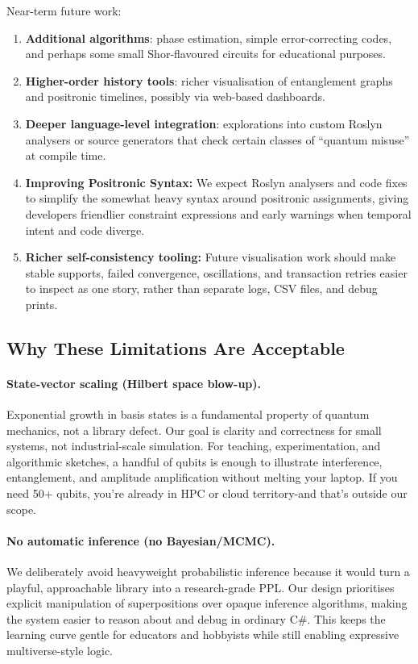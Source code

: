 \documentclass[a4paper,11pt]{article}
\begin{document}
Near-term future work:

\begin{enumerate}
\def\labelenumi{\arabic{enumi}.}
\item
  \textbf{Additional algorithms}: phase estimation, simple error-correcting codes, and perhaps some small Shor-flavoured circuits for educational purposes.
\item
  \textbf{Higher-order history tools}: richer visualisation of entanglement graphs and positronic timelines, possibly via web-based dashboards.
\item
  \textbf{Deeper language-level integration}: explorations into custom Roslyn analysers or source generators that check certain classes of ``quantum misuse'' at compile time.
\item
  \textbf{Improving Positronic Syntax:} We expect Roslyn analysers and code fixes to simplify the somewhat heavy syntax around positronic assignments, giving developers friendlier constraint expressions and early warnings when temporal intent and code diverge.
\item
  \textbf{Richer self-consistency tooling:} Future visualisation work should make
  stable supports, failed convergence, oscillations, and transaction retries easier
  to inspect as one story, rather than separate logs, CSV files, and debug prints.
\end{enumerate}

\subsection*{Why These Limitations Are Acceptable}

\paragraph{State-vector scaling (Hilbert space blow-up).}
Exponential growth in basis states is a fundamental property of quantum mechanics, not a library defect. Our goal is clarity and correctness for small systems, not industrial-scale simulation. For teaching, experimentation, and algorithmic sketches, a handful of qubits is enough to illustrate interference, entanglement, and amplitude amplification without melting your laptop. If you need 50+ qubits, you're already in HPC or cloud territory-and that's outside our scope.

\paragraph{No automatic inference (no Bayesian/MCMC).}
We deliberately avoid heavyweight probabilistic inference because it would turn a playful, approachable library into a research-grade PPL. Our design prioritises explicit manipulation of superpositions over opaque inference algorithms, making the system easier to reason about and debug in ordinary C\#. This keeps the learning curve gentle for educators and hobbyists while still enabling expressive multiverse-style logic.
\end{document}
